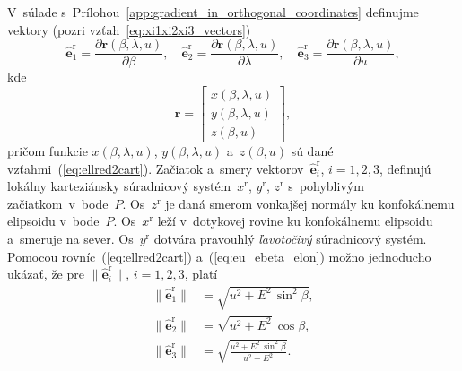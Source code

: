 \documentclass[a4paper, 12pt]{book}
\let\vec\mathbf
\begin{document}
V~súlade s~Prílohou~\ref{app:gradient_in_orthogonal_coordinates} definujme 
vektory (pozri vzťah~\ref{eq:xi1xi2xi3_vectors})
%
\begin{equation}
\label{eq:eu_ebeta_elon}
\hat{\vec e}_1^\mathrm{r} = \frac{\partial \vec r(\beta, \lambda, u)}{\partial 
\beta}{,}
%
\quad
%
\hat{\vec e}_2^\mathrm{r} = \frac{\partial \vec r(\beta, \lambda, u)}{\partial 
\lambda}{,}
%
\quad
%
\hat{\vec e}_3^\mathrm{r} = \frac{\partial \vec r(\beta, \lambda, u)}{\partial 
u}{,}
%
\end{equation}
%
kde
%
\begin{equation}
\vec r =
%
\begin{bmatrix}
x(\beta, \lambda, u)\\
y(\beta, \lambda, u)\\
z(\beta, u)
\end{bmatrix}
{,}
%
\end{equation}
%
pričom funkcie $x(\beta, \lambda, u)$, $y(\beta, \lambda, u)$ a~$z(\beta, u)$ 
sú dané vzťahmi~(\ref{eq:ellred2cart}).  Začiatok a~smery vektorov~$\hat{\vec 
e}_i^\mathrm{r}$, $i = 1, 2, 3$, definujú lokálny karteziánsky súradnicový 
systém~$x^\mathrm{r}$, $y^\mathrm{r}$, $z^\mathrm{r}$ s~pohyblivým 
začiatkom~v~bode~$P$.  Os~$z^\mathrm{r}$ je daná smerom vonkajšej normály ku 
konfokálnemu elipsoidu v~bode~$P$.  Os~$x^\mathrm{r}$ leží v~dotykovej rovine 
ku konfokálnemu elipsoidu a~smeruje na sever.  Os~$y^\mathrm{r}$ dotvára 
pravouhlý \emph{ľavotočivý} súradnicový systém.
%
Pomocou rovníc~(\ref{eq:ellred2cart}) a~(\ref{eq:eu_ebeta_elon}) možno 
jednoducho ukázať, že pre $\| \hat{\vec e}_i^\mathrm{r} \|$, $i = 1, 2, 3$, 
platí
%
\begin{equation}
\label{eq:ei_reduced_ell_magnitudes}
\begin{split}
\| \hat{\vec e}_1^\mathrm{r} \| &= \sqrt{u^2 + E^2 \, \sin^2\beta}{,}\\
%
\| \hat{\vec e}_2^\mathrm{r} \| &= \sqrt{ u^2 + E^2} \, \cos\beta{,}\\
%
\| \hat{\vec e}_3^\mathrm{r} \| &= \sqrt{\frac{u^2 + E^2 \, \sin^2\beta}{u^2 
+ E^2}}{.}
\end{split}
\end{equation}
\end{document}
